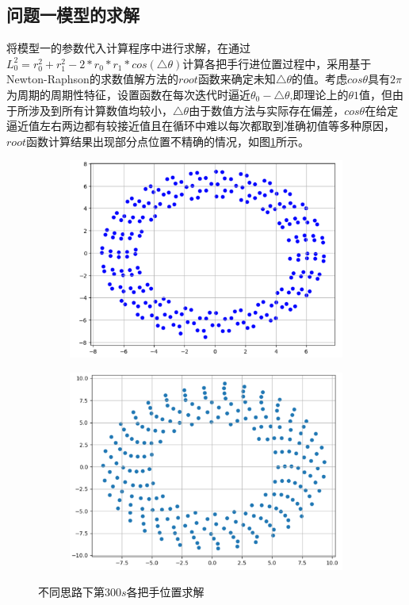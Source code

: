 \documentclass[withoutpreface,bwprint]{cumcmthesis}
\begin{document}
\subsection{问题一模型的求解}
将模型一的参数代入计算程序中进行求解，在通过$L_0^2 = r_0^2 +r_1^2 - 2*r_0*r_1*cos(\triangle\theta)$计算各把手行进位置过程中，采用基于Newton-Raphson的求数值解方法的$root$函数来确定未知$\triangle\theta$的值。考虑$cos\theta$具有$2\pi$为周期的周期性特征，设置函数在每次迭代时逼近$\theta_0-\triangle\theta$,即理论上的$\theta1$值，但由于所涉及到所有计算数值均较小，$\triangle\theta$由于数值方法与实际存在偏差，$cos\theta$在给定逼近值左右两边都有较接近值且在循环中难以每次都取到准确初值等多种原因，$root$函数计算结果出现部分点位置不精确的情况，如图\ref{fig:inacc}所示。
\begin{figure}[htbp!]
	\centering
	\begin{subfigure}[t]{0.45\textwidth}
		\includegraphics[width=\textwidth]{pics/inacc}
		\label{fig:inacc}
	\end{subfigure}
	\hfill
	\begin{subfigure}[t]{0.45\textwidth}
		\includegraphics[width=\textwidth]{pics/acc}
		\label{fig:qcc}
	\end{subfigure}
	\caption{不同思路下第$300s$各把手位置求解}
\end{figure}
\end{document}
